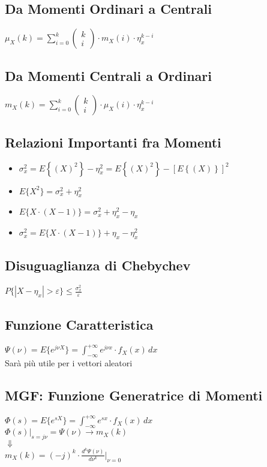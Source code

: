 \documentclass{article}
\begin{document}
\subsection{Da Momenti Ordinari a Centrali}
$\mu_X(k) = \sum_{i=0}^{k} \left( \begin{matrix} k \\ i\end{matrix} \right) \cdot m_X(i) \cdot \eta_x^{k-i}$

\subsection{Da Momenti Centrali a Ordinari}
$m_X(k) = \sum_{i=0}^{k} \left( \begin{matrix} k \\ i\end{matrix} \right) \cdot \mu_X(i) \cdot \eta_x^{k-i}$

\subsection{Relazioni Importanti fra Momenti}
\begin{itemize}
    \item $\sigma_x^2 = E \left\{ (X)^2 \right\} - \eta_x^2 = E \left\{ (X)^2 \right\} - \left[ E \left\{ (X) \right\} \right]^2$
    \item $E\Big\{ X^2 \Big\} = \sigma_x^2 + \eta_x^2$
    \item $E\Big\{ X \cdot (X-1) \Big\} = \sigma_x^2 + \eta_x^2 - \eta_x$
    \item $\sigma_x^2 = E\Big\{ X \cdot (X-1) \Big\} + \eta_x - \eta_x^2$
\end{itemize}

\subsection{Disuguaglianza di Chebychev}
$P \big\{ |X - \eta_x| > \varepsilon \big\} \leq \frac{\sigma_x^2}{\varepsilon}$

\subsection{Funzione Caratteristica}
$\Psi(\nu) = E \big\{ e^{j \nu X} \big\} = \int_{-\infty}^{+\infty} e^{j\nu x} \cdot f_X(x) \,dx $\\
Sarà più utile per i vettori aleatori

\subsection{MGF: Funzione Generatrice di Momenti}
$\Phi(s) = E \big\{ e^{sX} \big\} = \int_{-\infty}^{+\infty} e^{sx} \cdot f_X(x) \,dx$ \\
$\Phi(s)\big|_{s = j \nu} = \Psi(\nu) \rightarrow m_X(k)$\\
$\Downarrow$\\
$m_X(k) = (-j)^k \cdot \frac{d^k\Psi(\nu)}{d\nu^k} \Big|_{\nu=0}$
\end{document}

